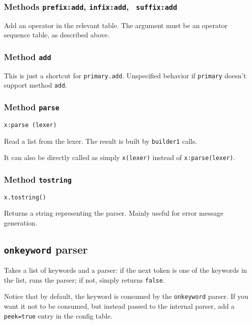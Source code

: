 \subsubsection{Methods {\tt prefix:add}, {\tt infix:add}, {\tt
    suffix:add}}
Add an operator in the relevant table. The argument must be an
operator sequence table, as described above.

\subsubsection{Method {\tt add}}
This is just a shortcut for {\tt primary.add}. Unspecified behavior if
{\tt primary} doesn't support method {\tt add}.


\subsubsection{Method {\tt parse}}

\begin{verbatim}
x:parse (lexer)
\end{verbatim}

Read a list from the lexer. The result is built by \verb|builder1| calls.

It can also be directly called as simply \verb|x(lexer)| instead of
\verb|x:parse(lexer)|.

\subsubsection{Method {\tt tostring}}

\begin{verbatim}
x.tostring()
\end{verbatim}

Returns a string representing the parser. Mainly useful for error
message generation.

\subsection{{\tt onkeyword} parser}

Takes a list of keywords and a parser: if the next token is one of the
keywords in the list, runs the parser; if not, simply returns
\verb|false|.

Notice that by default, the keyword is consumed by the
\verb|onkeyword| parser. If you want it not to be consumed, but
instead passed to the internal parser, add a \verb|peek=true| entry in
the config table.

